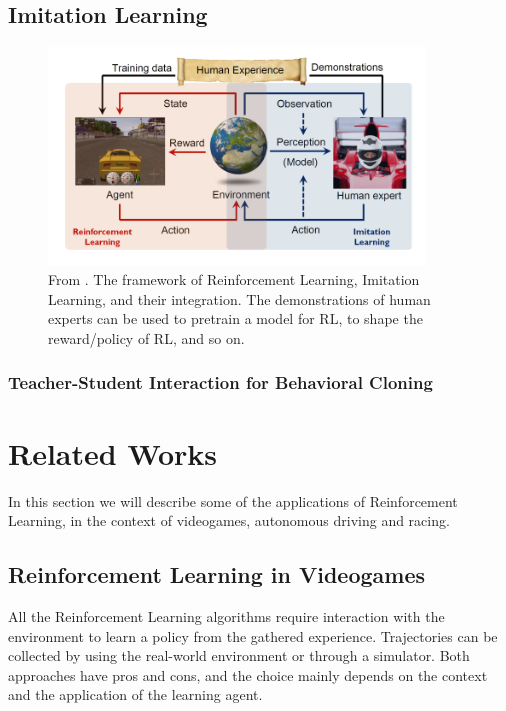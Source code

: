 \subsection{Imitation Learning}
\begin{figure}[t]
 \centering
  \captionsetup{width=10cm}
  \includegraphics[width=10cm]{./img/cinesi}
  \caption{From \cite{cinesi}. The framework of Reinforcement Learning, Imitation Learning, and their integration. The demonstrations of human experts can be used to pretrain a model for RL, to shape the reward/policy of RL, and so on.}
   \label{fig:cinesi}
\end{figure}


\subsubsection{Teacher-Student Interaction for Behavioral Cloning}
\label{teacher-student}

\cite{il}


\section{Related Works}



In this section we will describe some of the applications of Reinforcement Learning, in the context of videogames, autonomous driving and racing. 


\subsection{Reinforcement Learning in Videogames}

All the Reinforcement Learning algorithms require interaction with the environment to learn a policy from the gathered experience. Trajectories can be collected by using the real-world environment or through a simulator. 
Both approaches have pros and cons, and the choice mainly depends on the context and the application of the learning agent. 

